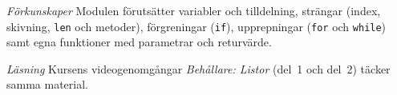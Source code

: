 \emph{Förkunskaper}
Modulen förutsätter variabler och tilldelning, strängar (index,
skivning, \texttt{len} och metoder), förgreningar
(\texttt{if}), upprepningar (\texttt{for} och
\texttt{while}) samt egna funktioner med parametrar och
returvärde.

\emph{Läsning}
Kursens videogenomgångar \emph{Behållare: Listor} (del~1 och del~2) täcker
samma material.
